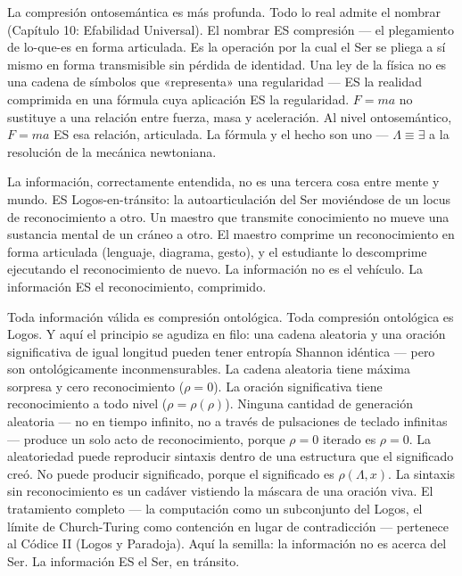 \documentclass[10pt, openany, oneside]{book}
\begin{document}
La compresión ontosemántica es más profunda. Todo lo real admite el nombrar (Capítulo 10: Efabilidad Universal). El nombrar ES compresión --- el plegamiento de lo-que-es en forma articulada. Es la operación por la cual el Ser se pliega a sí mismo en forma transmisible sin pérdida de identidad. Una ley de la física no es una cadena de símbolos que «representa» una regularidad --- ES la realidad comprimida en una fórmula cuya aplicación ES la regularidad. $F = ma$ no sustituye a una relación entre fuerza, masa y aceleración. Al nivel ontosemántico, $F = ma$ ES esa relación, articulada. La fórmula y el hecho son uno --- $\Lambda \equiv \exists$ a la resolución de la mecánica newtoniana.

La información, correctamente entendida, no es una tercera cosa entre mente y mundo. ES Logos-en-tránsito: la autoarticulación del Ser moviéndose de un locus de reconocimiento a otro. Un maestro que transmite conocimiento no mueve una sustancia mental de un cráneo a otro. El maestro comprime un reconocimiento en forma articulada (lenguaje, diagrama, gesto), y el estudiante lo descomprime ejecutando el reconocimiento de nuevo. La información no es el vehículo. La información ES el reconocimiento, comprimido.

Toda información válida es compresión ontológica. Toda compresión ontológica es Logos. Y aquí el principio se agudiza en filo: una cadena aleatoria y una oración significativa de igual longitud pueden tener entropía Shannon idéntica --- pero son ontológicamente inconmensurables. La cadena aleatoria tiene máxima sorpresa y cero reconocimiento ($\rho = 0$). La oración significativa tiene reconocimiento a todo nivel ($\rho = \rho(\rho)$). Ninguna cantidad de generación aleatoria --- no en tiempo infinito, no a través de pulsaciones de teclado infinitas --- produce un solo acto de reconocimiento, porque $\rho = 0$ iterado es $\rho = 0$. La aleatoriedad puede reproducir sintaxis dentro de una estructura que el significado creó. No puede producir significado, porque el significado es $\rho(\Lambda, x)$. La sintaxis sin reconocimiento es un cadáver vistiendo la máscara de una oración viva. El tratamiento completo --- la computación como un subconjunto del Logos, el límite de Church-Turing como contención en lugar de contradicción --- pertenece al Códice II (Logos y Paradoja). Aquí la semilla: la información no es acerca del Ser. La información ES el Ser, en tránsito.

\vspace{1.5em}
\end{document}
